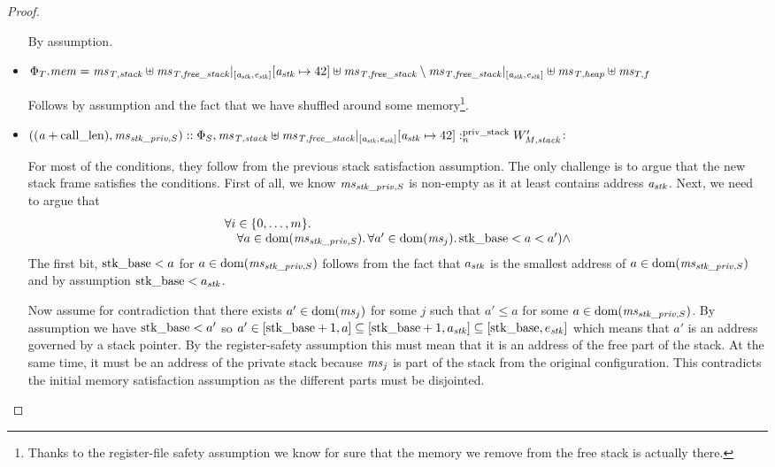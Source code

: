 \begin{proof}
\begin{itemize}
    By assumption.
  \item $\Phi_T.\mathit{mem} = \mathit{ms}_{\mathit{T,stack}} \uplus \mathit{ms}_{\mathit{T,free\_stack}}|_{[\mathit{a}_{\mathit{stk}},\mathit{e}_{\mathit{stk}}]}[\mathit{a}_{\mathit{stk}} \mapsto 42] \uplus \mathit{ms}_{\mathit{T,free\_stack}} \setminus \mathit{ms}_{\mathit{T,free\_stack}}|_{[\mathit{a}_{\mathit{stk}},\mathit{e}_{\mathit{stk}}]} \uplus \mathit{ms}_{\mathit{T,heap}} \uplus \mathit{ms}_{T,f}$

    Follows by assumption and the fact that we have shuffled around some memory\footnote{Thanks to the register-file safety assumption we know for sure that the memory we remove from the free stack is actually there.}.
  \item $((\mathit{a}+\mathrm{call\_len}),\mathit{ms}_{\mathit{stk}\_\mathit{priv},S}) :: \Phi_S,\mathit{ms}_{\mathit{T,stack}} \uplus \mathit{ms}_{\mathit{T,free\_stack}}|_{[\mathit{a}_{\mathit{stk}},\mathit{e}_{\mathit{stk}}]}[\mathit{a}_{\mathit{stk}} \mapsto 42] :_{n}^{\text{priv\_stack}}W_{M,\mathit{stack}}'$:

    For most of the conditions, they follow from the previous stack satisfaction assumption.
    The only challenge is to argue that the new stack frame satisfies the conditions.
    First of all, we know $\mathit{ms}_{\mathit{stk}\_\mathit{priv},S}$ is non-empty as it at least contains address $\mathit{a}_{\mathit{stk}}$.
    Next, we need to argue that
    \[
      \begin{array}{l}
        \forall i \in \{0,\dots,m\} \ldotp \\
        \quad \forall a \in \mathrm{dom}(\mathit{ms}_{\mathit{stk}\_\mathit{priv},S}) \ldotp \forall a' \in \mathrm{dom}(\mathit{ms}_j) \ldotp \mathrm{stk\_base} < a < a') \wedge\\
      \end{array}
    \]
    The first bit, $\mathrm{stk\_base} < a$ for $a \in \mathrm{dom}(\mathit{ms}_{\mathit{stk}\_\mathit{priv},S})$ follows from the fact that $a_{\mathit{stk}}$ is the smallest address of $a \in \mathrm{dom}(\mathit{ms}_{\mathit{stk}\_\mathit{priv},S})$ and by assumption $\mathrm{stk\_base} < a_{\mathit{stk}}$.

    Now assume for contradiction that there exists $a' \in \mathrm{dom}(\mathit{ms}_j)$ for some $j$ such that $a' \le a$ for some $a \in \mathrm{dom}(\mathit{ms}_{\mathit{stk}\_\mathit{priv},S})$.
    By assumption we have $\mathrm{stk\_base} < a'$ so $a' \in [\mathrm{stk\_base}+1,a] \subseteq [\mathrm{stk\_base}+1,a_{\mathit{stk}}] \subseteq [\mathrm{stk\_base},e_{\mathit{stk}}]$ which means that $a'$ is an address governed by a stack pointer.
    By the register-safety assumption this must mean that it is an address of the free part of the stack.
    At the same time, it must be an address of the private stack because $\mathit{ms}_j$ is part of the stack from the original configuration.
    This contradicts the initial memory satisfaction assumption as the different parts must be disjointed.


\end{itemize}
\end{proof}
